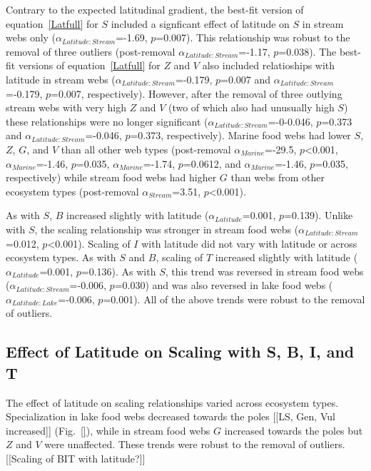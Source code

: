 \documentclass[12pt]{article}
\begin{document}
Contrary to the expected latitudinal gradient, the best-fit version of
equation~\ref{Latfull} for $S$ included a signficant effect of latitude on $S$
in stream webs only ($\alpha_{Latitude:Stream}$=-1.69, $p$=0.007).  This
relationship was robust to the removal of three outliers (post-removal
$\alpha_{Latitude:Stream}$=-1.17, $p$=0.038). The best-fit versions of
equation~\ref{Latfull} for $Z$ and $V$ also included relatioships with
latitude in stream webs ($\alpha_{Latitude:Stream}$=-0.179, $p$=0.007 and
$\alpha_{Latitude:Stream}$=-0.179, $p$=0.007, respectively). However, after
the removal of three outlying stream webs with very high $Z$ and $V$ (two of
which also had unusually high $S$) these relationships were no longer
significant ($\alpha_{Latitude:Stream}$=-0-0.046, $p$=0.373 and
$\alpha_{Latitude:Stream}$=-0.046, $p$=0.373, respectively). Marine food webs
had lower $S$, $Z$, $G$, and $V$ than all other web types (post-removal
$\alpha_{Marine}$=-29.5, $p$\textless0.001, $\alpha_{Marine}$=-1.46,
$p$=0.035, $\alpha_{Marine}$=-1.74, $p$=0.0612, and $\alpha_{Marine}$=-1.46,
$p$=0.035, respectively) while stream food webs had higher $G$ than webs from
other ecosystem types (post-removal $\alpha_{Stream}$=3.51,
$p$\textless0.001).


As with $S$, $B$ increased slightly with latitude ($\alpha_{Latitude}$=0.001, $p$=0.139). Unlike with $S$, the scaling 
relationship was stronger in stream food webs ($\alpha_{Latitude:Stream}$=0.012, $p$\textless0.001). 
Scaling of $I$ with latitude did not vary with latitude or across
ecosystem types. 
As with $S$ and $B$, scaling of $T$ increased slightly with 
latitude ($\alpha_{Latitude}$=0.001, $p$=0.136). As with $S$,
this trend was reversed in stream food webs ($\alpha_{Latitude:Stream}$=-0.006, $p$=0.030) and was also reversed in 
lake food webs ($\alpha_{Latitude:Lake}$=-0.006, $p$=0.001).
All of the above trends were robust to the removal of outliers.


\subsection*{Effect of Latitude on Scaling with S, B, I, and T}

The effect of latitude on scaling relationships varied across ecosystem types.
Specialization in lake food webs decreased towards the poles [[LS, Gen, Vul
increased]] (Fig.~\ref{}), while in stream food webs $G$ increased towards the
poles but $Z$ and $V$ were unaffected.  These trends were robust to the
removal of outliers. [[Scaling of BIT with latitude?]]
\end{document}
